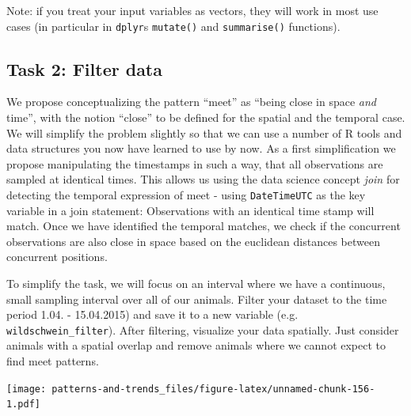 \documentclass[]{book}
\newenvironment{Shaded}{\begin{snugshade}}{\end{snugshade}}
\newcommand{\KeywordTok}[1]{\textcolor[rgb]{0.13,0.29,0.53}{\textbf{#1}}}
\newcommand{\DataTypeTok}[1]{\textcolor[rgb]{0.13,0.29,0.53}{#1}}
\newcommand{\FloatTok}[1]{\textcolor[rgb]{0.00,0.00,0.81}{#1}}
\newcommand{\StringTok}[1]{\textcolor[rgb]{0.31,0.60,0.02}{#1}}
\newcommand{\OperatorTok}[1]{\textcolor[rgb]{0.81,0.36,0.00}{\textbf{#1}}}
\newcommand{\NormalTok}[1]{#1}
\begin{document}
Note: if you treat your input variables as vectors, they will work in
most use cases (in particular in \texttt{dplyr}s \texttt{mutate()} and
\texttt{summarise()} functions).

\subsection{Task 2: Filter data}\label{task-2-filter-data}

We propose conceptualizing the pattern ``meet'' as ``being close in
space \emph{and} time'', with the notion ``close'' to be defined for the
spatial and the temporal case. We will simplify the problem slightly so
that we can use a number of R tools and data structures you now have
learned to use by now. As a first simplification we propose manipulating
the timestamps in such a way, that all observations are sampled at
identical times. This allows us using the data science concept
\emph{join} for detecting the temporal expression of meet - using
\texttt{DateTimeUTC} as the key variable in a join statement:
Observations with an identical time stamp will match. Once we have
identified the temporal matches, we check if the concurrent observations
are also close in space based on the euclidean distances between
concurrent positions.

To simplify the task, we will focus on an interval where we have a
continuous, small sampling interval over all of our animals. Filter your
dataset to the time period 1.04. - 15.04.2015) and save it to a new
variable (e.g. \texttt{wildschwein\_filter}). After filtering, visualize
your data spatially. Just consider animals with a spatial overlap and
remove animals where we cannot expect to find meet patterns.

\begin{Shaded}
\end{Shaded}

\texttt{[image: patterns-and-trends\_files/figure-latex/unnamed-chunk-156-1.pdf]}
\end{document}
